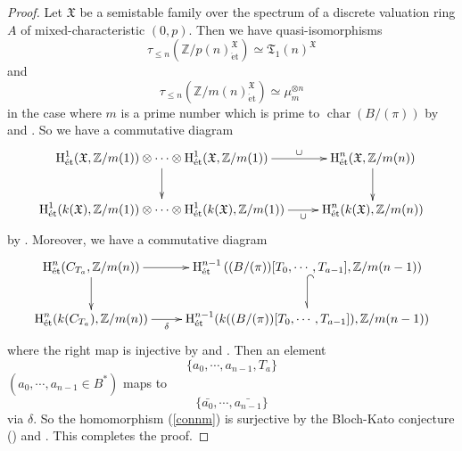 \documentclass{article}
\newcommand{\et}{\mathrm{\acute{e}t}}
\newcommand{\HO}{\operatorname{H}}
\begin{document}
\begin{proof}
Let $\mathfrak{X}$ be a semistable family over the spectrum of a discrete valuation ring $A$
of mixed-characteristic $(0, p)$. Then we have quasi-isomorphisms
%
\begin{equation*}
\tau_{\leq n}\left(
\mathbb{Z}/p(n)_{\et}^{\mathfrak{X}}
\right)
\simeq
\mathfrak{T}_{1}(n)^{\mathfrak{X}}
\end{equation*}
%
and
%
\begin{equation*}
\tau_{\leq n}\left(
\mathbb{Z}/m(n)_{\et}^{\mathfrak{X}}
\right)
\simeq
\mu_{m}^{\otimes n}
\end{equation*}
%
in the case where $m$ is a prime number which is prime to 
$\operatorname{char}(B/(\pi))$ by \cite[p.209, Remark 7.2]{SaR}
and \cite[Remark 4.7]{Sak4}.
So we have a commutative diagram
%
\begin{equation*}
\xymatrix{
\HO^{1}_{\et}(
\mathfrak{X}, 
\mathbb{Z}/m(1)
)
\otimes\cdots\otimes
\HO^{1}_{\et}(
\mathfrak{X}, 
\mathbb{Z}/m(1)
)
\ar[r]^-{\cup}\ar[d]
&
\HO^{n}_{\et}(
\mathfrak{X}, 
\mathbb{Z}/m(n)
)  \ar[d]
\\
\HO^{1}_{\et}(
k(\mathfrak{X}), 
\mathbb{Z}/m(1)
)
\otimes\cdots\otimes
\HO^{1}_{\et}(
k(\mathfrak{X}), 
\mathbb{Z}/m(1)
)
\ar[r]_-{\cup}
&
\HO^{n}_{\et}(
k(\mathfrak{X}), 
\mathbb{Z}/m(n)
) 
}    
\end{equation*}
%
by \cite[p.538, Proposition 4.2.6]{SaP}. Moreover, we have a commutative diagram
%
\begin{equation*}
\xymatrix{
\HO^{n}_{\et}(C_{T_{a}},
\mathbb{Z}/m(n)
)
\ar[r]\ar[d]
&
\HO^{n-1}_{\et}\left(
(B/(\pi))[T_{0}, \cdots, T_{a-1}],
\mathbb{Z}/m(n-1)
\right)
\ar@{^{(}-_>}[d]
\\
\HO^{n}_{\et}(
k(C_{T_{a}}),
\mathbb{Z}/m(n)
)
\ar[r]_-{\delta}
&
\HO^{n-1}_{\et}(
k((B/(\pi))[T_{0}, \cdots, T_{a-1}]),
\mathbb{Z}/m(n-1)
)
}    
\end{equation*}
%
where the right map is injective by 
\cite[p.781, Corollary 3.5]{Ge} and \cite[Corollary 6.9]{Sak5}.
Then an element 
%
\begin{equation*}
\{a_{0}, \cdots, a_{n-1}, T_{a}\}    
\end{equation*}
%
$(a_{0}, \cdots, a_{n-1}\in B^{*})$
maps to
%
\begin{equation*}
\{\bar{a_{0}}, \cdots, \bar{a_{n-1}}\}    
\end{equation*}
%
via $\delta$. So the homomorphism (\ref{connm}) is surjective by the Bloch-Kato conjecture (\cite{V2})
and \cite[p.113, Theorem (2.1)]{B-K}. This completes the proof.
\end{proof}
%
\end{document}
